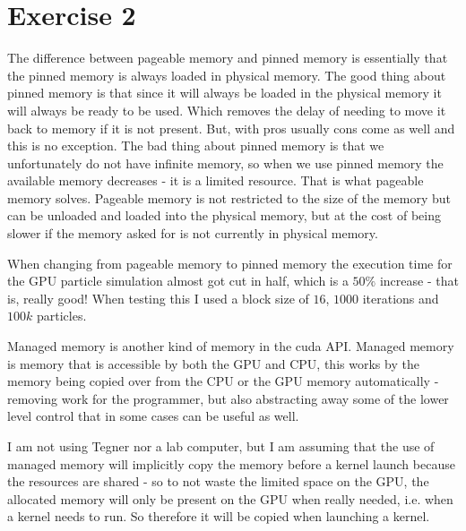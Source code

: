 \documentclass[a4paper, 12pt]{article}
\begin{document}



\section{Exercise 2}
The difference between pageable memory and pinned memory is essentially that the pinned memory is always loaded in physical memory. The good thing about pinned memory is that since it will always be loaded in the physical memory it will always be ready to be used. Which removes the delay of needing to move it back to memory if it is not present. But, with pros usually cons come as well and this is no exception. The bad thing about pinned memory is that we unfortunately do not have infinite memory, so when we use pinned memory the available memory decreases - it is a limited resource. That is what pageable memory solves. Pageable memory is not restricted to the size of the memory but can be unloaded and loaded into the physical memory, but at the cost of being slower if the memory asked for is not currently in physical memory.

When changing from pageable memory to pinned memory the execution time for the GPU particle simulation almost got cut in half, which is a $50\%$ increase - that is, really good! When testing this I used a block size of $16$, $1000$ iterations and $100k$ particles.

Managed memory is another kind of memory in the cuda API. Managed memory is memory that is accessible by both the GPU and CPU, this works by the memory being copied over from the CPU or the GPU memory automatically - removing work for the programmer, but also abstracting away some of the lower level control that in some cases can be useful as well.

I am not using Tegner nor a lab computer, but I am assuming that the use of managed memory will implicitly copy the memory before a kernel launch because the resources are shared - so to not waste the limited space on the GPU, the allocated memory will only be present on the GPU when really needed, i.e. when a kernel needs to run. So therefore it will be copied when launching a kernel.
\end{document}
